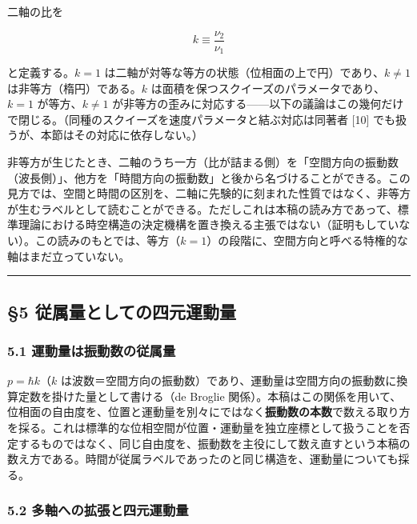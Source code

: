 \documentclass[
]{ltjsarticle}
\begin{document}
二軸の比を

\[k\equiv\frac{\nu_2}{\nu_1}\]

と定義する。\(k=1\)
は二軸が対等な等方の状態（位相面の上で円）であり、\(k\neq1\)
は非等方（楕円）である。\(k\)
は面積を保つスクイーズのパラメータであり、\(k=1\) が等方、\(k\neq1\)
が非等方の歪みに対応する------以下の議論はこの幾何だけで閉じる。（同種のスクイーズを速度パラメータと結ぶ対応は同著者
{[}10{]} でも扱うが、本節はその対応に依存しない。）

非等方が生じたとき、二軸のうち一方（比が詰まる側）を「空間方向の振動数（波長側）」、他方を「時間方向の振動数」と後から名づけることができる。この見方では、空間と時間の区別を、二軸に先験的に刻まれた性質ではなく、非等方が生むラベルとして読むことができる。ただしこれは本稿の読み方であって、標準理論における時空構造の決定機構を置き換える主張ではない（証明もしていない）。この読みのもとでは、等方（\(k=1\)）の段階に、空間方向と呼べる特権的な軸はまだ立っていない。

\begin{center}\rule{0.5\linewidth}{0.5pt}\end{center}

\subsection{§5
従属量としての四元運動量}\label{ux5f93ux5c5eux91cfux3068ux3057ux3066ux306eux56dbux5143ux904bux52d5ux91cf}

\subsubsection{5.1
運動量は振動数の従属量}\label{ux904bux52d5ux91cfux306fux632fux52d5ux6570ux306eux5f93ux5c5eux91cf}

\(p=\hbar k\)（\(k\)
は波数＝空間方向の振動数）であり、運動量は空間方向の振動数に換算定数を掛けた量として書ける（de
Broglie
関係）。本稿はこの関係を用いて、位相面の自由度を、位置と運動量を別々にではなく\textbf{振動数の本数}で数える取り方を採る。これは標準的な位相空間が位置・運動量を独立座標として扱うことを否定するものではなく、同じ自由度を、振動数を主役にして数え直すという本稿の数え方である。時間が従属ラベルであったのと同じ構造を、運動量についても採る。

\subsubsection{5.2
多軸への拡張と四元運動量}\label{ux591aux8ef8ux3078ux306eux62e1ux5f35ux3068ux56dbux5143ux904bux52d5ux91cf}
\end{document}
